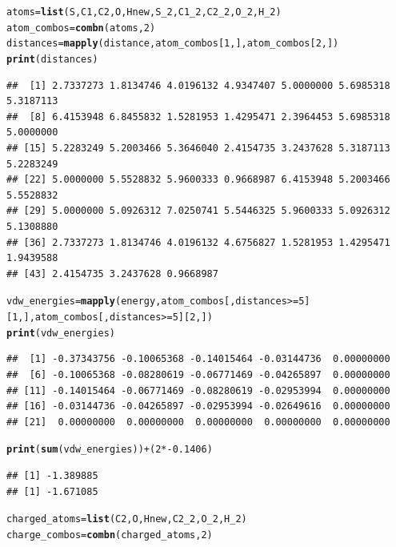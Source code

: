 \documentclass{article}\usepackage[]{graphicx}\usepackage[]{color}
\makeatletter
\newcommand{\hlnum}[1]{\textcolor[rgb]{0.686,0.059,0.569}{#1}}%
\newcommand{\hlopt}[1]{\textcolor[rgb]{0,0,0}{#1}}%
\newcommand{\hlstd}[1]{\textcolor[rgb]{0.345,0.345,0.345}{#1}}%
\newcommand{\hlkwb}[1]{\textcolor[rgb]{0.69,0.353,0.396}{#1}}%
\newcommand{\hlkwd}[1]{\textcolor[rgb]{0.737,0.353,0.396}{\textbf{#1}}}%
\newenvironment{kframe}{%
 \def\at@end@of@kframe{}%
 \ifinner\ifhmode%
  \def\at@end@of@kframe{\end{minipage}}%
  \begin{minipage}{\columnwidth}%
 \fi\fi%
 \def\FrameCommand##1{\hskip\@totalleftmargin \hskip-\fboxsep
 \colorbox{shadecolor}{##1}\hskip-\fboxsep
     \hskip-\linewidth \hskip-\@totalleftmargin \hskip\columnwidth}%
 \MakeFramed {\advance\hsize-\width
   \@totalleftmargin\z@ \linewidth\hsize
   \@setminipage}}%
 {\par\unskip\endMakeFramed%
 \at@end@of@kframe}
\newenvironment{knitrout}{}{} %
\makeatother
\begin{document}
\begin{knitrout}
\color{fgcolor}\begin{kframe}
\begin{alltt}
  \hlstd{atoms} \hlkwb{=} \hlkwd{list}\hlstd{(S,C1,C2,O,Hnew,S_2,C1_2,C2_2,O_2,H_2)}
  \hlstd{atom_combos} \hlkwb{=} \hlkwd{combn}\hlstd{(atoms,}\hlnum{2}\hlstd{)}
  \hlstd{distances}\hlkwb{=}\hlkwd{mapply}\hlstd{(distance,atom_combos[}\hlnum{1}\hlstd{,],atom_combos[}\hlnum{2}\hlstd{,])}
  \hlkwd{print}\hlstd{(distances)}
\end{alltt}
\begin{verbatim}
##  [1] 2.7337273 1.8134746 4.0196132 4.9347407 5.0000000 5.6985318 5.3187113
##  [8] 6.4153948 6.8455832 1.5281953 1.4295471 2.3964453 5.6985318 5.0000000
## [15] 5.2283249 5.2003466 5.3646040 2.4154735 3.2437628 5.3187113 5.2283249
## [22] 5.0000000 5.5528832 5.9600333 0.9668987 6.4153948 5.2003466 5.5528832
## [29] 5.0000000 5.0926312 7.0250741 5.5446325 5.9600333 5.0926312 5.1308880
## [36] 2.7337273 1.8134746 4.0196132 4.6756827 1.5281953 1.4295471 1.9439588
## [43] 2.4154735 3.2437628 0.9668987
\end{verbatim}
\begin{alltt}
  \hlstd{vdw_energies} \hlkwb{=} \hlkwd{mapply}\hlstd{(energy,atom_combos[,distances}\hlopt{>=}\hlnum{5}\hlstd{][}\hlnum{1}\hlstd{,],atom_combos[,distances}\hlopt{>=}\hlnum{5}\hlstd{][}\hlnum{2}\hlstd{,])}
  \hlkwd{print}\hlstd{(vdw_energies)}
\end{alltt}
\begin{verbatim}
##  [1] -0.37343756 -0.10065368 -0.14015464 -0.03144736  0.00000000
##  [6] -0.10065368 -0.08280619 -0.06771469 -0.04265897  0.00000000
## [11] -0.14015464 -0.06771469 -0.08280619 -0.02953994  0.00000000
## [16] -0.03144736 -0.04265897 -0.02953994 -0.02649616  0.00000000
## [21]  0.00000000  0.00000000  0.00000000  0.00000000  0.00000000
\end{verbatim}
\begin{alltt}
  \hlkwd{print}\hlstd{(}\hlkwd{sum}\hlstd{(vdw_energies))}\hlopt{+}\hlstd{(}\hlnum{2}\hlopt{*-}\hlnum{0.1406}\hlstd{)}
\end{alltt}
\begin{verbatim}
## [1] -1.389885
## [1] -1.671085
\end{verbatim}
\begin{alltt}
  \hlstd{charged_atoms} \hlkwb{=} \hlkwd{list}\hlstd{(C2,O,Hnew,C2_2,O_2,H_2)}
  \hlstd{charge_combos} \hlkwb{=} \hlkwd{combn}\hlstd{(charged_atoms,}\hlnum{2}\hlstd{)}

\end{alltt}
\end{kframe}
\end{knitrout}
\end{document}
